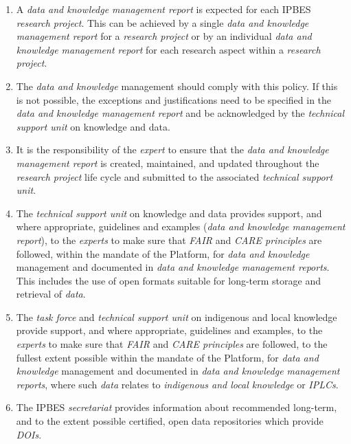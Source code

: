 \documentclass{article}
\begin{document}
\begin{enumerate}[label=(\alph*)] %
    \item A \textit{data and knowledge management report} is expected for each IPBES \textit{research project}. This can be achieved by a single \textit{data and knowledge management report} for a \textit{research project} or by an individual \textit{data and knowledge management report} for each research aspect within a \textit{research project}.
    
    \item The \textit{data and knowledge} management should comply with this policy. If this is not possible, the exceptions and justifications need to be specified in the \textit{data and knowledge management report} and be acknowledged by the \textit{technical support unit} on knowledge and data.
    
    \item It is the responsibility of the \textit{expert} to ensure that the \textit{data and knowledge management report} is created, maintained, and updated throughout the \textit{research project} life cycle and submitted to the associated \textit{technical support unit}.
    
    \item The \textit{technical support unit} on knowledge and data provides support, and where appropriate, guidelines and examples (\textit{data and knowledge management report}), to the \textit{experts} to make sure that \textit{FAIR} and \textit{CARE principles} are followed, within the mandate of the Platform, for \textit{data and knowledge} management and documented in \textit{data and knowledge management reports}. This includes the use of open formats suitable for long-term storage and retrieval of \textit{data}.
    
    \item The \textit{task force} and \textit{technical support unit} on indigenous and local knowledge provide support, and where appropriate, guidelines and examples, to the \textit{experts} to make sure that \textit{FAIR} and \textit{CARE principles} are followed, to the fullest extent possible within the mandate of the Platform, for \textit{data and knowledge} management and documented in \textit{data and knowledge management reports}, where such \textit{data} relates to \textit{indigenous and local knowledge} or \textit{IPLCs}.
    
    \item The IPBES \textit{secretariat} provides information about recommended long-term, and to the extent possible certified, open data repositories which provide \textit{DOIs}.
\end{enumerate}
\end{document}
